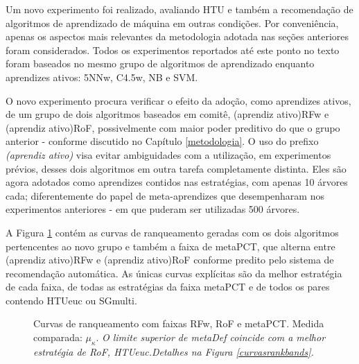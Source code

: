 Um novo experimento foi realizado, avaliando HTU e também a recomendação de algoritmos de aprendizado de máquina em outras condições.
Por conveniência, apenas os aspectos mais relevantes da metodologia adotada nas seções anteriores foram considerados.
Todos os experimentos reportados até este ponto no texto foram baseados no mesmo grupo de algoritmos de aprendizado enquanto aprendizes ativos: 5NNw, C4.5w, NB e SVM.

O novo experimento procura verificar o efeito da adoção, como aprendizes ativos, de um grupo de dois algoritmos baseados em comitê, (aprendiz ativo)RFw e (aprendiz ativo)RoF, possivelmente com maior poder preditivo do que o grupo anterior - conforme discutido no Capítulo \ref{metodologia}.
O uso do prefixo \textit{(aprendiz ativo)} visa evitar ambiguidades com a utilização, em experimentos prévios, desses dois algoritmos em outra tarefa completamente distinta.
Eles são agora adotados como aprendizes contidos nas estratégias, com apenas 10 árvores cada; diferentemente do papel de meta-aprendizes que desempenharam nos experimentos anteriores - em que puderam ser utilizadas 500 árvores.

A Figura \ref{plotfim} contém as curvas de ranqueamento geradas com os dois algoritmos pertencentes ao novo grupo e também a faixa de metaPCT, que alterna entre (aprendiz ativo)RFw e (aprendiz ativo)RoF conforme predito pelo sistema de recomendação automática.
As únicas curvas explícitas são da melhor estratégia de cada faixa, de todas as estratégias da faixa metaPCT e de todos os pares contendo HTUeuc ou SGmulti.
\begin{figure}[]
\centering
	
	\caption[Curvas de ranqueamento com faixas RFw, RoF e metaPCT.]{Curvas de ranqueamento com faixas RFw, RoF e metaPCT. Medida comparada: $\mu_{\kappa}$.
	\textit{O limite superior de metaDef coincide com a melhor estratégia de RoF, HTUeuc.}\textit{Detalhes na Figura \ref{curvasrankbands}.}}
	\label{plotfim}
\end{figure}

